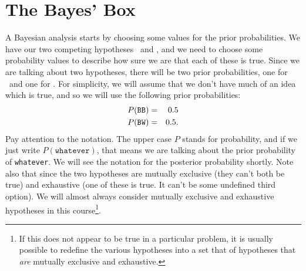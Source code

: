 \section{The Bayes' Box}
A Bayesian analysis starts by choosing some values for the prior probabilities.
We have our two competing hypotheses \bb~and \bw, and we need to choose some
probability values to describe how sure we are that each of these is true.
Since we are talking about two hypotheses, there will be two prior probabilities,
one for \bb~and one for \bw.
For simplicity, we will assume that we don't have much of an idea which is true,
and so we will use the following prior probabilities:
\begin{eqnarray}
P(\texttt{BB}) &=& 0.5\\
P(\texttt{BW}) &=& 0.5.
\end{eqnarray}
Pay attention to the notation. The upper case $P$ stands for probability, and if we just
write $P(\texttt{whatever})$, that means we are talking about the
prior probability of {\tt whatever}. We will see the notation for the posterior probability
shortly. Note also that since the two hypotheses are mutually exclusive
(they can't both be true) and exhaustive (one of these is true. It can't be
some undefined third option).
We will almost always consider mutually exclusive and exhaustive hypotheses in
this course\footnote{If this does not appear to be true in a particular problem,
it is usually possible to redefine the various hypotheses into a set that of
hypotheses that {\it are}
mutually exclusive and exhaustive.}.

